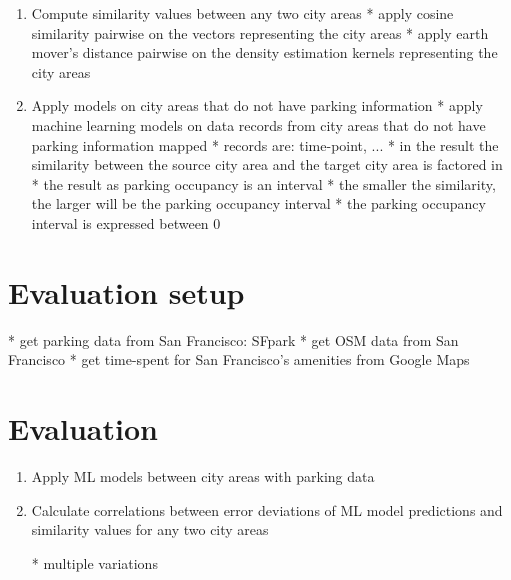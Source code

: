 \documentclass{article}
\begin{document}
\begin{enumerate}[label=\Roman*]
		\item{Compute similarity values between any two city areas}
		* apply cosine similarity pairwise on the vectors representing the city areas
		* apply earth mover's distance pairwise on the density estimation kernels representing the city areas
		
		\item{Apply models on city areas that do not have parking information}
		* apply machine learning models on data records from city areas that do not have parking information mapped
		* records are: time-point, ...
		* in the result the similarity between the source city area and the target city area is factored in
		* the result as parking occupancy is an interval		
		* the smaller the similarity, the larger will be the parking occupancy interval
		* the parking occupancy interval is expressed between 0%
		
		\end{enumerate}
		
	\section{Evaluation setup}
	* get parking data from San Francisco: SFpark
	* get OSM data from San Francisco
	* get time-spent for San Francisco's amenities from Google Maps
	
	\section{Evaluation}
				
		\begin{enumerate}[label=\Roman*.]
			\item{Apply ML models between city areas with parking data}
			
			\item{Calculate correlations between error deviations of ML model predictions and similarity values for any two city areas}	
			
			* multiple variations
		\end{enumerate}
				
\end{document}
